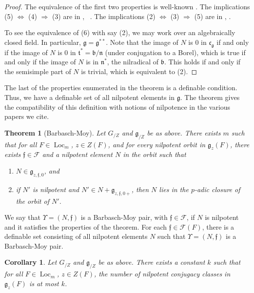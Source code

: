 \documentclass[12pt]{amsart}
\newcommand{\op}[1]{\operatorname{#1}}
\def\Y{\Upsilon}
\def\s{{\mathfrak{f}}}
\newcommand{\cF}{\mathcal{F}}
\newcommand{\fg}{\mathfrak{g}}
\newcommand{\fb}{\mathfrak{b}}
\newcommand{\fn}{\mathfrak{n}}
\newcommand{\fc}{\mathfrak{c}}
\newcommand{\ft}{\mathfrak{t}}
\theoremstyle{plain}
\newtheorem{theorem}[thm]{Theorem}
\newtheorem{cor}[thm]{Corollary}
\theoremstyle{definition}
\begin{document}
\begin{proof} The equivalence of the first two properties is
  well-known \cite[15.3]{humphreys1975linear}.  The implications (5) $\Leftrightarrow$
  (4) $\Rightarrow$ (3) are in \cite{debacker:nilp},
  ~\cite[2.5.1]{adler-debacker:bt-lie}.  The implications (2)
  $\Leftrightarrow$ (3) $\Rightarrow$ (5) are in \cite[3.5]{mcninch},
  \cite[4.1,Prop 4]{mcninch}.

To see the equivalence of (6) with say (2), we may work over an
algebraically closed field. In particular, $\fg = \fg^{**}$.  Note that the image of
$N$ is $0$ in $\fc_{\fg}$ if and only if the image of $N$ is $0$ in
$\ft^* = \fb/\fn$ (under conjugation to a Borel), which is true if
and only if the image of $N$ is in $\fn^*$, the nilradical of $\fb$.
This holds if and only if the semisimple part of $N$ is trivial, which
is equivalent to (2).
\end{proof}

The last of the properties enumerated in the theorem is a definable
condition.  Thus, we have a definable set of all nilpotent elements in
$\fg$.  The theorem gives the compatibility of this definition with
notions of nilpotence in the various papers we cite.

\begin{theorem}[Barbasch-Moy]\label{thm:bm} 
  Let $G_{/Z}$ and $\fg_{/Z}$ be as above.  There exists $m$ such that
  for all $F\in \op{Loc}_m$, $z\in Z(F)$, and for every nilpotent
  orbit in $\fg_z(F)$, there exists $\s\in \cF$ and a nilpotent
  element $N$ in the orbit such that
\begin{enumerate}
   \item $N\in \fg_{z,\s,0}$, and
   \item if $N'$ is nilpotent and $N'\in N + \fg_{z,\s,0+}$, then $N$
     lies in the $p$-adic closure of the orbit of $N'$.
\end{enumerate}
\end{theorem}

We say that $\Y=(N,\s)$ is a Barbasch-Moy pair, with $\s\in \cF$, if $N$
is nilpotent and it satisfies the properties of the theorem.  For each
$\s\in \cF(F)$, there is a definable set consisting of all nilpotent
elements $N$ such that $\Y=(N,\s)$ is a
Barbasch-Moy pair.

\begin{cor}\label{thm:nilbound}  Let $G_{/Z}$ and $\fg_{/Z}$ be as above.  
There exists a constant $k$ such that for all $F\in \op{Loc}_m$, $z\in
Z(F)$, the number of nilpotent conjugacy classes in $\fg_z(F)$ is at
most $k$.
\end{cor}
\end{document}
